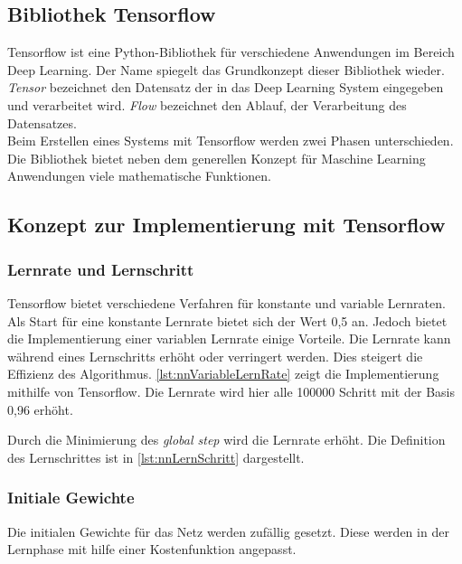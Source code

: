 \subsection{Bibliothek Tensorflow}
Tensorflow ist eine Python-Bibliothek für verschiedene Anwendungen im Bereich Deep Learning. 
Der Name spiegelt das Grundkonzept dieser Bibliothek wieder. 
\textit{Tensor} bezeichnet den Datensatz der in das Deep Learning System 
eingegeben und verarbeitet wird. \textit{Flow} bezeichnet den Ablauf, 
der Verarbeitung des Datensatzes. \\
Beim Erstellen eines Systems mit Tensorflow werden zwei Phasen 
unterschieden. 
Die Bibliothek bietet neben dem generellen Konzept für Maschine Learning Anwendungen 
viele mathematische Funktionen. 
\cite{tf:2018}

\subsection{Konzept zur Implementierung mit Tensorflow}
\subsubsection{Lernrate und Lernschritt}
Tensorflow bietet verschiedene Verfahren für konstante und variable Lernraten. 
Als Start für eine konstante Lernrate bietet sich der Wert 0,5 an. Jedoch bietet 
die Implementierung einer variablen Lernrate einige Vorteile. Die Lernrate kann während 
eines Lernschritts erhöht oder verringert werden. Dies steigert die Effizienz des Algorithmus. 
\autoref{lst:nnVariableLernRate} zeigt die Implementierung mithilfe von Tensorflow. 
Die Lernrate wird hier alle 100000 Schritt mit der Basis 0,96 erhöht. 





Durch die Minimierung des \textit{global step} wird die Lernrate erhöht. 
Die Definition des Lernschrittes ist in \autoref{lst:nnLernSchritt} dargestellt.



\subsubsection{Initiale Gewichte}
Die initialen Gewichte für das Netz werden zufällig gesetzt. Diese werden in der Lernphase 
mit hilfe einer Kostenfunktion angepasst.

